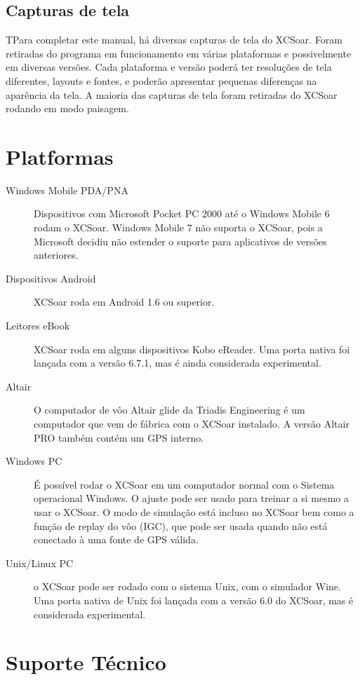 \subsection*{Capturas de tela}
TPara completar este manual, há diversas capturas de tela do XCSoar.  Foram retiradas do programa em funcionamento em várias plataformas e possivelmente em diversas versões.  Cada plataforma e versão poderá ter resoluções de tela diferentes, layouts e fontes, e poderão apresentar pequenas diferenças na aparência da tela.  A maioria das capturas de tela foram retiradas do XCSoar rodando em modo paisagem.

\section{Platformas}
\begin{description}
\item[Windows Mobile PDA/PNA]
Dispositivos com Microsoft Pocket PC  2000 até o Windows Mobile 6 rodam o XCSoar.   Windows Mobile 7 não suporta o XCSoar, pois a Microsoft decidiu não estender o suporte para aplicativos de versões anteriores.
\item[Dispositivos Android]
XCSoar roda em Android 1.6 ou superior.
\item [Leitores eBook]
XCSoar roda em alguns dispositivos Kobo eReader.  Uma porta nativa foi lançada com a versão 6.7.1, mas é ainda considerada experimental.
\item[Altair]
O computador de vôo Altair glide da Triadis Engineering é um computador que vem de fábrica com o XCSoar instalado.  A versão Altair PRO também contém um GPS interno.
\item[Windows PC]
É possível rodar o XCSoar em um computador normal com o Sistema operacional Windows.  O ajuste pode ser usado para treinar a si mesmo a usar o XCSoar.  O modo de simulação está incluso no XCSoar bem como a função de replay do vôo (IGC), que pode ser usada quando não está conectado à uma fonte de GPS válida.
\item[Unix/Linux PC]
o XCSoar pode ser rodado com o sistema Unix, com o simulador Wine.  Uma porta nativa de Unix foi lançada com a versão 6.0 do XCSoar, mas é considerada experimental.
\end{description}



\section{Suporte Técnico}

